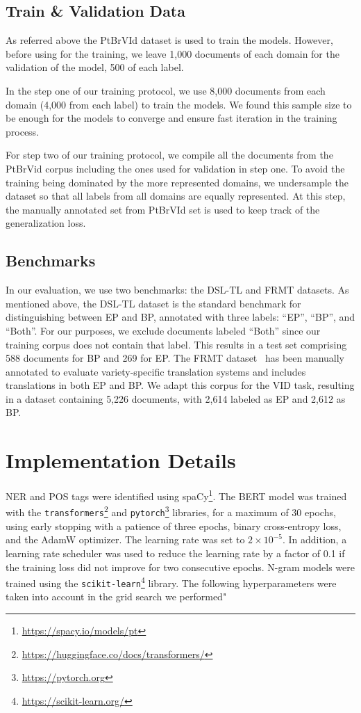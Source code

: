 \subsection{Train \& Validation Data}
As referred above the PtBrVId dataset is used to train the models. However, before using for the training, we leave 1,000 documents of each domain for the validation of the model, 500 of each label. 

In the step one of our training protocol, we use 8,000 documents from each domain (4,000 from each label) to train the models. We found this sample size to be enough for the models to converge and ensure fast iteration in the training process.

For step two of our training protocol, we compile all the documents from the PtBrVid corpus including the ones used for validation in step one. To avoid the training being dominated by the more represented domains, we undersample the dataset so that all labels from all domains are equally represented. At this step, the manually annotated set from PtBrVId set is used to keep track of the generalization loss.


\subsection{Benchmarks}

In our evaluation, we use two benchmarks: the DSL-TL and FRMT datasets. As mentioned above, the DSL-TL dataset is the standard benchmark for distinguishing between EP and BP, annotated with three labels: ``EP'', ``BP'', and ``Both''. For our purposes, we exclude documents labeled ``Both'' since our training corpus does not contain that label. This results in a test set comprising 588 documents for BP and 269 for EP. The FRMT dataset~\cite{riley2022frmt} has been manually annotated to evaluate variety-specific translation systems and includes translations in both EP and BP. We adapt this corpus for the VID task, resulting in a dataset containing 5,226 documents, with 2,614 labeled as EP and 2,612 as BP.


\section{Implementation Details}
\label{app:hyper}

NER and POS tags were identified using spaCy\footnote{\url{https://spacy.io/models/pt}}. The BERT model was trained with the \texttt{transformers}\footnote{\url{https://huggingface.co/docs/transformers/}} and \texttt{pytorch}\footnote{\url{https://pytorch.org}} libraries, for a maximum of 30 epochs, using early stopping with a patience of three epochs, binary cross-entropy loss, and the AdamW optimizer. The learning rate was set to $2 \times 10^{-5}$. In addition, a learning rate scheduler was used to reduce the learning rate by a factor of 0.1 if the training loss did not improve for two consecutive epochs. N-gram models were trained using the \texttt{scikit-learn}\footnote{\url{https://scikit-learn.org/}} library. The following hyperparameters were taken into account in the grid search we performed"

